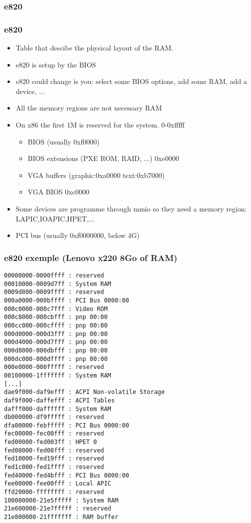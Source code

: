 \subsubsection{e820}
        \begin{frame}
        \frametitle{e820}
        \begin{itemize}
                \item Table that descibe the physical layout of the RAM.
                \item e820 is setup by the BIOS
                \item e820 could change is you: select some BIOS options,
                add some RAM, add a device, ...
                \item All the memory regions are not necessary RAM
                \item On x86 the first 1M is reserved for the system.
                0-0xfffff
                        \begin{itemize}
                        \item BIOS (usually 0xf0000)
                        \item BIOS extensions (PXE ROM, RAID, ...) 0xe0000
                        \item VGA buffers (graphic:0xa0000 text:0xb7000)
                        \item VGA BIOS 0xc0000
                        \end{itemize} 
                \item Some devices are programme through mmio so they
                need a memory region: LAPIC,IOAPIC,HPET,...
                \item PCI bus (usually 0xf0000000, below 4G)
        \end{itemize}
        \end{frame}

        \begin{frame}[fragile]
        \frametitle{e820 exemple (Lenovo x220 8Go of RAM)}
\begin{verbatim}
00000000-0000ffff : reserved
00010000-0009d7ff : System RAM
0009d800-0009ffff : reserved
000a0000-000bffff : PCI Bus 0000:00
000c0000-000c7fff : Video ROM
000c8000-000cbfff : pnp 00:00
000cc000-000cffff : pnp 00:00
000d0000-000d3fff : pnp 00:00
000d4000-000d7fff : pnp 00:00
000d8000-000dbfff : pnp 00:00
000dc000-000dffff : pnp 00:00
000e0000-000fffff : reserved
00100000-1fffffff : System RAM
[...]
dae9f000-daf9efff : ACPI Non-volatile Storage
daf9f000-daffefff : ACPI Tables
dafff000-daffffff : System RAM
db000000-df9fffff : reserved
dfa00000-febfffff : PCI Bus 0000:00
fec00000-fec00fff : reserved
fed00000-fed003ff : HPET 0
fed08000-fed08fff : reserved
fed10000-fed19fff : reserved
fed1c000-fed1ffff : reserved
fed40000-fed4bfff : PCI Bus 0000:00
fee00000-fee00fff : Local APIC
ffd20000-ffffffff : reserved
100000000-21e5fffff : System RAM
21e600000-21e7fffff : reserved
21e800000-21fffffff : RAM buffer
\end{verbatim}
\end{frame}

